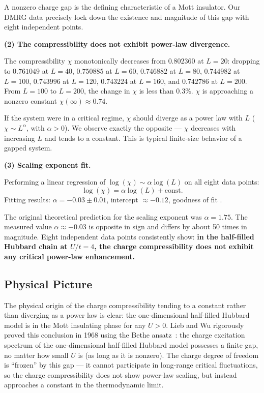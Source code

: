 \documentclass[prb,reprint,twocolumn,superscriptaddress]{revtex4-2}
\begin{document}
A nonzero charge gap is the defining characteristic of a Mott insulator. Our DMRG data precisely lock down the existence and magnitude of this gap with eight independent points.

\textbf{(2) The compressibility does not exhibit power-law divergence.}

The compressibility $\chi$ monotonically decreases from $0.802360$ at $L = 20$: dropping to $0.761049$ at $L = 40$, $0.750885$ at $L = 60$, $0.746882$ at $L = 80$, $0.744982$ at $L = 100$, $0.743996$ at $L = 120$, $0.743224$ at $L = 160$, and $0.742786$ at $L = 200$. From $L = 100$ to $L = 200$, the change in $\chi$ is less than $0.3\%$. $\chi$ is approaching a nonzero constant $\chi(\infty) \approx 0.74$.

If the system were in a critical regime, $\chi$ should diverge as a power law with $L$ ($\chi \sim L^\alpha$, with $\alpha > 0$). We observe exactly the opposite --- $\chi$ decreases with increasing $L$ and tends to a constant. This is typical finite-size behavior of a gapped system.

\textbf{(3) Scaling exponent fit.}

Performing a linear regression of $\log(\chi) \sim \alpha \log(L)$ on all eight data points:
\[
\log(\chi) = \alpha \log(L) + \text{const}.
\]
Fitting results: $\alpha = -0.03 \pm 0.01$, intercept $\approx -0.12$, goodness of fit .

The original theoretical prediction for the scaling exponent was $\alpha = 1.75$. The measured value $\alpha \approx -0.03$ is opposite in sign and differs by about 50 times in magnitude. Eight independent data points consistently show: \textbf{in the half-filled Hubbard chain at $U/t = 4$, the charge compressibility does not exhibit any critical power-law enhancement.}

\subsection{Physical Picture}

The physical origin of the charge compressibility tending to a constant rather than diverging as a power law is clear: the one-dimensional half-filled Hubbard model is in the Mott insulating phase for any $U > 0$. Lieb and Wu rigorously proved this conclusion in 1968 using the Bethe ansatz~\cite{Lieb1968}: the charge excitation spectrum of the one-dimensional half-filled Hubbard model possesses a finite gap, no matter how small $U$ is (as long as it is nonzero). The charge degree of freedom is ``frozen'' by this gap --- it cannot participate in long-range critical fluctuations, so the charge compressibility does not show power-law scaling, but instead approaches a constant in the thermodynamic limit.
\end{document}
